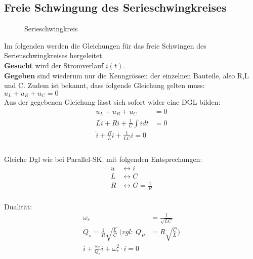 \subsection{Freie Schwingung des Serieschwingkreises}

\begin{wrapfigure}{l}{0.55\textwidth}
	\centering
	
	\vspace{-0.15cm}
	\caption{Serieschwingkreis}
	\label{fig:SerieSKGeschlossen}
\end{wrapfigure}

Im folgenden werden die Gleichungen für das freie Schwingen des
Serienschwingkreises hergeleitet.\\

\textbf{Gesucht} wird der Stromverlauf
$i(t)$. \\
\textbf{Gegeben} sind wiederum nur die Kenngrössen der einzelnen Bauteile, also
R,L und C. Zudem ist bekannt, dass folgende Gleichung gelten muss: \\ $u_L +
u_R + u_C = 0$ \\


Aus der gegebenen Gleichung lässt sich sofort wider eine DGL bilden: \\
\begin{align}
	u_L + u_R + u_C &= 0\nonumber\\
	L\dot{i} + Ri + \frac{1}{C}\int{i}dt&=0\nonumber\\
	\boxed{\ddot{i}+\frac{R}{L}\dot{i}+\frac{1}{LC}i=0}
	\\
	\nonumber
\end{align}\\



Gleiche Dgl wie bei Parallel-SK. mit folgenden Entsprechungen:\\
\begin{align}
u &\leftrightarrow i\nonumber\\
L &\leftrightarrow C\nonumber\\
R &\leftrightarrow G=\frac{1}{R}\nonumber
\end{align}\\

Dualität:\\
\begin{align}
\omega_r&=\frac{1}{\sqrt{LC}}\nonumber\\
Q_s=\frac{1}{R}\sqrt{\frac{L}{C}}\ (vgl:\ Q_P&=R\sqrt{\frac{C}{L}})\nonumber\\
\boxed{\ddot i + \frac{\omega_r}{Q_s}\dot i + \omega_r^2\cdot i = 0}
\end{align}\\

